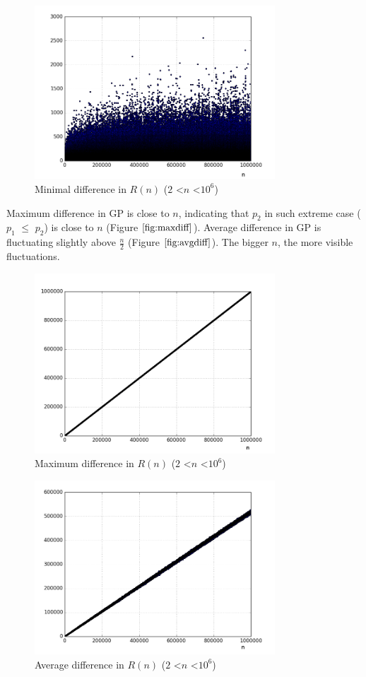 \documentclass[10pt,twocolumn]{article}
\begin{document}
\begin{figure}[ht]
\centering
\includegraphics[width=9cm]{f_min_diff_pairs}
\caption{Minimal difference in $R(n)$ ($2$ \textless $n$ \textless $10^6$)}
\label{fig:mindiff}
\end{figure}

Maximum difference in GP is close to $n$, indicating that $p_2$ in such extreme case ($p_1$ $\leq$  $p_2$) is close to $n$ (Figure $\ref{fig:maxdiff}$). Average difference in GP is fluctuating slightly above $\frac{n}{2}$ (Figure $\ref{fig:avgdiff}$). The bigger $n$, the more visible fluctuations. \par

\begin{figure}[ht]
\centering
\includegraphics[width=9cm]{f_max_diff_pairs}
\caption{Maximum difference in $R(n)$ ($2$ \textless $n$ \textless $10^6$)}
\label{fig:maxdiff}
\end{figure}

\begin{figure}[ht]
\centering
\includegraphics[width=9cm]{f_avg_diff_pairs}
\caption{Average difference in $R(n)$ ($2$ \textless $n$ \textless $10^6$)}
\label{fig:avgdiff}
\end{figure}
\end{document}
